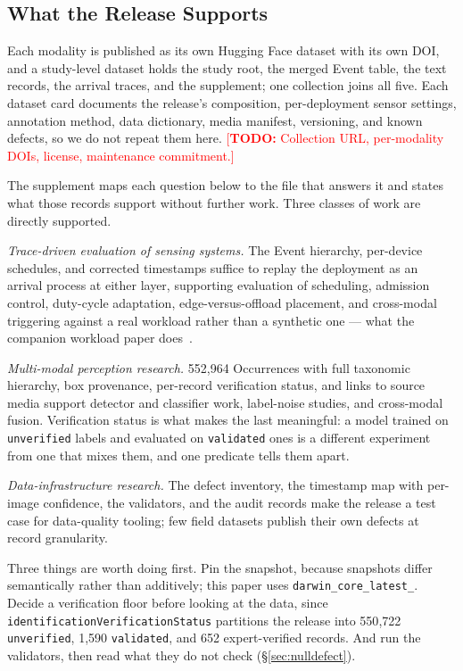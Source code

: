 \documentclass[sigconf]{acmart}
\newcommand{\TODO}[1]{\textcolor{red}{\footnotesize[\textbf{TODO:} #1]}}
\newcommand{\TODO}[1]{}
\begin{document}
\subsection{What the Release Supports}

Each modality is published as its own Hugging Face dataset with its own
DOI, and a study-level dataset holds the study root, the merged Event
table, the text records, the arrival traces, and the supplement; one
collection joins all five. Each dataset card documents the release's
composition, per-deployment sensor settings, annotation method, data
dictionary, media manifest, versioning, and known defects, so we do not
repeat them here.
\TODO{Collection URL, per-modality DOIs, license, maintenance
commitment.}

The supplement maps each question below to the file that answers it and
states what those records support without further work. Three classes
of work are directly supported.

\emph{Trace-driven evaluation of sensing systems.} The Event hierarchy,
per-device schedules, and corrected timestamps suffice to replay the
deployment as an arrival process at either layer, supporting evaluation
of scheduling, admission control, duty-cycle adaptation,
edge-versus-offload placement, and cross-modal triggering against a real
workload rather than a synthetic one --- what the companion workload
paper does~\cite{smartwilds_workload}.

\emph{Multi-modal perception research.} 552{,}964 Occurrences with full
taxonomic hierarchy, box provenance, per-record verification status, and
links to source media support detector and classifier work, label-noise
studies, and cross-modal fusion. Verification status is what makes the
last meaningful: a model trained on \texttt{unverified} labels and evaluated
on \texttt{validated} ones is a different experiment from one that mixes
them, and one predicate tells them apart.

\emph{Data-infrastructure research.} The defect inventory, the timestamp
map with per-image confidence, the validators, and the audit records
make the release a test case for data-quality tooling; few field
datasets publish their own defects at record granularity.



Three things are worth doing first. Pin the snapshot, because snapshots
differ semantically rather than additively; this paper uses
\texttt{darwin\_core\_\allowbreak latest\_}. Decide a verification floor before
looking at the data, since
\texttt{identification\allowbreak Verification\allowbreak Status} partitions the release into
550{,}722 \texttt{unverified}, 1{,}590 \texttt{validated}, and
652 expert-verified records. And run the validators, then read what
they do not check (\S\ref{sec:nulldefect}).
\end{document}
